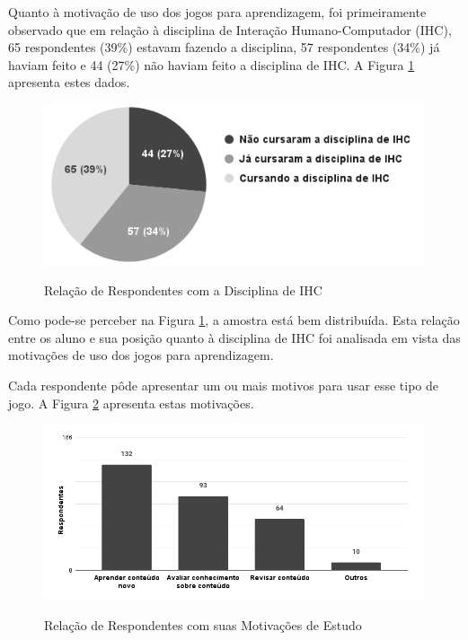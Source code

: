 Quanto à motivação de uso dos jogos para aprendizagem, foi primeiramente observado que em relação à disciplina de Interação Humano-Computador (IHC), 65 respondentes (39\%) estavam fazendo a disciplina, 57 respondentes (34\%) já haviam feito e 44 (27\%) não haviam feito a disciplina de IHC. A Figura \ref{Fig:rel-disc-ihc.png} apresenta estes dados.

\begin{figure}[htbp]
	\centering
	\caption{Relação de Respondentes com a Disciplina de IHC}
	\includegraphics[keepaspectratio=true,scale=0.65]{figuras/resultados/rel-disc-ihc.png}
	\label{Fig:rel-disc-ihc.png}
\end{figure}

Como pode-se perceber na Figura \ref{Fig:rel-disc-ihc.png}, a amostra está bem distribuída. Esta relação entre os aluno e sua posição quanto à disciplina de IHC foi analisada em vista das motivações de uso dos jogos para aprendizagem. 

Cada respondente pôde apresentar um ou mais motivos para usar esse tipo de jogo. A Figura \ref{Fig:obj-estudo.png} apresenta estas motivações.

\begin{figure}[htbp]
	\centering
	\caption{Relação de Respondentes com suas Motivações de Estudo}
	\includegraphics[keepaspectratio=true,scale=0.55]{figuras/resultados/obj-estudo.png}
	\label{Fig:obj-estudo.png}
\end{figure}

